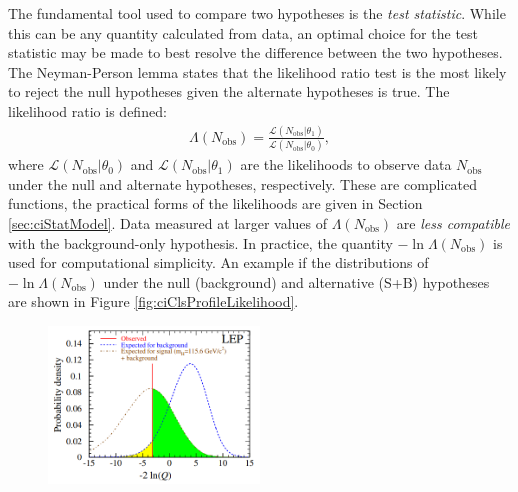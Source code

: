 The fundamental tool used to compare two hypotheses is the \emph{test statistic}.
While this can be any quantity calculated from data, an optimal choice for the test statistic may be made to best resolve the difference between the two hypotheses.
The Neyman-Person lemma states that the likelihood ratio test is the most likely to reject the null hypotheses given the alternate hypotheses is true.
The likelihood ratio is defined:
\begin{equation}\begin{split}\label{eqn:ciLikelihoodTestStat}
\Lambda(N_\text{obs})=\frac{\mathcal{L}(N_\text{obs}|\theta_1)}{\mathcal{L}(N_\text{obs}|\theta_0)},
\end{split}\end{equation} 
where $\mathcal{L}(N_\text{obs}|\theta_0)$ and $\mathcal{L}(N_\text{obs}|\theta_1)$ are the likelihoods to observe data $N_\text{obs}$ under the null and alternate hypotheses, respectively.
These are complicated functions, the practical forms of the likelihoods are given in Section \ref{sec:ciStatModel}.
Data measured at larger values of $\Lambda(N_\text{obs})$ are \emph{less compatible} with the background-only hypothesis.
In practice, the quantity $-\ln{\Lambda(N_\text{obs})}$ is used for computational simplicity.
An example if the distributions of $-\ln{\Lambda(N_\text{obs})}$ under the null (background) and alternative (S+B) hypotheses are shown in Figure \ref{fig:ciClsProfileLikelihood}.

\begin{figure}[h!]
\captionsetup[subfigure]{position=b}
\centering
\includegraphics[width=0.5\textwidth]{figures/ci/cls.png}
\caption{}
\label{fig:ciCls}
\end{figure}

